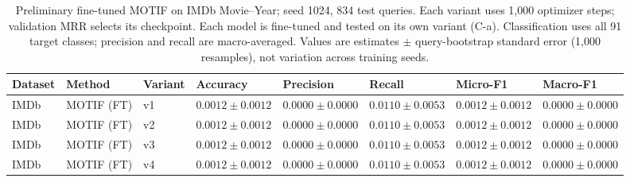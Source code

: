 \begin{table}[htbp]
\centering
\small
\renewcommand{\arraystretch}{1.15}
\setlength{\tabcolsep}{5pt}
\begin{adjustbox}{max width=\linewidth}
\begin{tabular}{|l|l|l|l|l|l|l|l|}
\hline
\textbf{Dataset} & \textbf{Method} & \textbf{Variant} & \textbf{Accuracy} & \textbf{Precision} & \textbf{Recall} & \textbf{Micro-F1} & \textbf{Macro-F1} \\
\hline
IMDb & MOTIF (FT) & v1 & $0.0012 \pm 0.0012$ & $0.0000 \pm 0.0000$ & $0.0110 \pm 0.0053$ & $0.0012 \pm 0.0012$ & $0.0000 \pm 0.0000$ \\
\hline
IMDb & MOTIF (FT) & v2 & $0.0012 \pm 0.0012$ & $0.0000 \pm 0.0000$ & $0.0110 \pm 0.0053$ & $0.0012 \pm 0.0012$ & $0.0000 \pm 0.0000$ \\
\hline
IMDb & MOTIF (FT) & v3 & $0.0012 \pm 0.0012$ & $0.0000 \pm 0.0000$ & $0.0110 \pm 0.0053$ & $0.0012 \pm 0.0012$ & $0.0000 \pm 0.0000$ \\
\hline
IMDb & MOTIF (FT) & v4 & $0.0012 \pm 0.0012$ & $0.0000 \pm 0.0000$ & $0.0110 \pm 0.0053$ & $0.0012 \pm 0.0012$ & $0.0000 \pm 0.0000$ \\
\hline
\end{tabular}
\end{adjustbox}
\caption{Preliminary fine-tuned MOTIF on IMDb Movie--Year; seed 1024, 834 test queries. Each variant uses 1,000 optimizer steps; validation MRR selects its checkpoint. Each model is fine-tuned and tested on its own variant (C-a). Classification uses all 91 target classes; precision and recall are macro-averaged. Values are estimates $\pm$ query-bootstrap standard error (1,000 resamples), not variation across training seeds.}
\label{tab:motif-imdb-movie-year-matrix-classification-diagonal}
\end{table}
